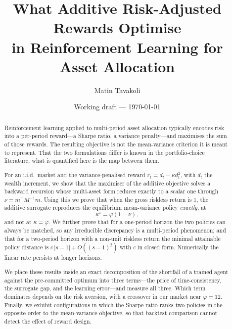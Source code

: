 \documentclass[11pt,a4paper]{article}
\title{\vspace{-2em}What Additive Risk-Adjusted Rewards Optimise\\
in Reinforcement Learning for Asset Allocation}
\author{Matin Tavakoli}
\date{Working draft --- \today}
\theoremstyle{plain}
\theoremstyle{definition}
\theoremstyle{remark}
\begin{document}
\maketitle
\vspace{-1em}

\begin{abstract}
\noindent
Reinforcement learning applied to multi-period asset allocation typically encodes
risk into a per-period reward---a Sharpe ratio, a variance penalty---and maximises
the sum of those rewards. The resulting objective is not the mean-variance
criterion it is meant to represent. That the two formulations differ is known in
the portfolio-choice literature; what is quantified here is the map between them.

For an i.i.d.\ market and the variance-penalised reward $r_t=d_t-\kappa d_t^2$,
with $d_t$ the wealth increment, we show that the maximiser of the additive
objective solves a backward recursion whose multi-asset form reduces exactly to a
scalar one through $\nu=m^{\top}M^{-1}m$. Using this we prove that when the gross
riskless return is $1$, the additive surrogate reproduces the equilibrium
mean-variance policy \emph{exactly}, at
\[
\kappa^{\star}=\varphi(1-\nu),
\]
and not at $\kappa=\varphi$. We further prove that for a one-period horizon the
two policies can always be matched, so any irreducible discrepancy is a
multi-period phenomenon; and that for a two-period horizon with a non-unit
riskless return the minimal attainable policy distance is
$c\,|s-1|+O((s-1)^2)$ with $c$ in closed form. Numerically the linear rate
persists at longer horizons.

We place these results inside an exact decomposition of the shortfall of a
trained agent against the pre-committed optimum into three terms---the price of
time-consistency, the surrogate gap, and the learning error---and measure all
three. Which term dominates depends on the risk aversion, with a crossover in our
market near $\varphi=12$. Finally, we exhibit configurations in which the Sharpe
ratio ranks two policies in the opposite order to the mean-variance objective,
so that backtest comparison cannot detect the effect of reward design.
\end{abstract}

\begin{center}
\end{center}
\end{document}
